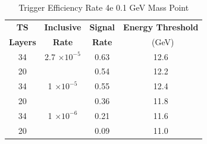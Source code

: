 \begin{table}
 \centering
\caption{Trigger Efficiency Rate 4e 0.1 GeV Mass Point}
\begin{tabular}{ c | c | c | c }
\textbf{TS} & \textbf{Inclusive} & \textbf{Signal} & \textbf{Energy Threshold}  \\ \textbf{Layers} & \textbf{Rate} & \textbf{Rate} & \ (GeV) \\ 
\hline
34 & 2.7 $\times 10^{-5}$ & 0.63 & 12.6 \\ 
20 & & 0.54 & 12.2 \\ 
\hline 
34 & 1 $\times 10^{-5}$ & 0.55 & 12.4 \\ 
20 & & 0.36 & 11.8 \\ 
\hline 
34 & 1 $\times 10^{-6}$ & 0.21 & 11.6 \\ 
20 & & 0.09 & 11.0 \\ 
\hline 
\end{tabular}
\end{table}
